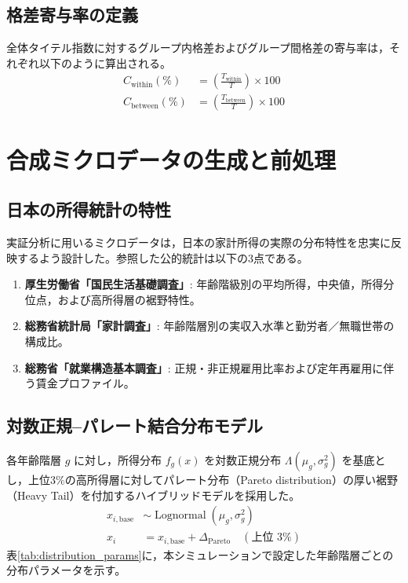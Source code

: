 \documentclass[paper=a4,fontsize=10.5pt,line_length=42zw]{jlreq}
\begin{document}
\subsection{格差寄与率の定義}
全体タイテル指数に対するグループ内格差およびグループ間格差の寄与率は，それぞれ以下のように算出される。
\begin{align}
    C_{\text{within}} (\%) &= \left( \frac{T_{\text{within}}}{T} \right) \times 100 \label{eq:contrib_within} \\
    C_{\text{between}} (\%) &= \left( \frac{T_{\text{between}}}{T} \right) \times 100 \label{eq:contrib_between}
\end{align}

\section{合成ミクロデータの生成と前処理}

\subsection{日本の所得統計の特性}
実証分析に用いるミクロデータは，日本の家計所得の実際の分布特性を忠実に反映するよう設計した。参照した公的統計は以下の3点である。
\begin{enumerate}
    \item \textbf{厚生労働省「国民生活基礎調査」}: 年齢階級別の平均所得，中央値，所得分位点，および高所得層の裾野特性。
    \item \textbf{総務省統計局「家計調査」}: 年齢階層別の実収入水準と勤労者／無職世帯の構成比。
    \item \textbf{総務省「就業構造基本調査」}: 正規・非正規雇用比率および定年再雇用に伴う賃金プロファイル。
\end{enumerate}

\subsection{対数正規--パレート結合分布モデル}
各年齢階層 $g$ に対し，所得分布 $f_g(x)$ を対数正規分布 $\Lambda(\mu_g, \sigma_g^2)$ を基底とし，上位3\%の高所得層に対してパレート分布（Pareto distribution）の厚い裾野（Heavy Tail）を付加するハイブリッドモデルを採用した。
\begin{align}
    x_{i, \text{base}} &\sim \operatorname{Lognormal}(\mu_g, \sigma_g^2) \\
    x_i &= x_{i, \text{base}} + \Delta_{\text{Pareto}} \quad (\text{上位 } 3\%)
\end{align}
表\ref{tab:distribution_params}に，本シミュレーションで設定した年齢階層ごとの分布パラメータを示す。
\end{document}
